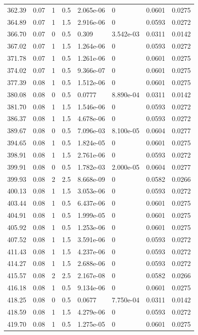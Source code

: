 \documentclass[preview]{standalone}
\begin{document}
{{{\begin{tabular}{L{1.2cm}C{1.2cm} C{0.3cm}C{0.5cm} C{1.4cm}C{1.4cm} C{1.4cm}C{1.4cm}}
  362.39  &  0.07  & 1     & 0.5 &  2.065e-06  & 0  & 0.0601 &  0.0275   \\ 
  364.89  &  0.07  & 1     & 1.5 &  2.916e-06  & 0  & 0.0593 &  0.0272   \\ 
  366.70  &  0.07  & 0     & 0.5 &  0.309  & 3.542e-03  & 0.0311 &  0.0142   \\ 
  367.02  &  0.07  & 1     & 1.5 &  1.264e-06  & 0  & 0.0593 &  0.0272   \\ 
  371.78  &  0.07  & 1     & 0.5 &  1.261e-06  & 0  & 0.0601 &  0.0275   \\ 
  374.02  &  0.07  & 1     & 0.5 &  9.366e-07  & 0  & 0.0601 &  0.0275   \\ 
  377.39  &  0.08  & 1     & 0.5 &  1.512e-06  & 0  & 0.0601 &  0.0275   \\ 
  380.08  &  0.08  & 0     & 0.5 &  0.0777  & 8.890e-04  & 0.0311 &  0.0142   \\ 
  381.70  &  0.08  & 1     & 1.5 &  1.546e-06  & 0  & 0.0593 &  0.0272   \\ 
  386.37  &  0.08  & 1     & 1.5 &  4.678e-06  & 0  & 0.0593 &  0.0272   \\ 
  389.67  &  0.08  & 0     & 0.5 &  7.096e-03  & 8.100e-05  & 0.0604 &  0.0277   \\ 
  394.65  &  0.08  & 1     & 0.5 &  1.824e-05  & 0  & 0.0601 &  0.0275   \\ 
  398.91  &  0.08  & 1     & 1.5 &  2.761e-06  & 0  & 0.0593 &  0.0272   \\ 
  399.91  &  0.08  & 0     & 0.5 &  1.782e-03  & 2.000e-05  & 0.0604 &  0.0277   \\ 
  399.93  &  0.08  & 2     & 2.5 &  8.668e-09  & 0  & 0.0582 &  0.0266   \\ 
  400.13  &  0.08  & 1     & 1.5 &  3.053e-06  & 0  & 0.0593 &  0.0272   \\ 
  403.44  &  0.08  & 1     & 0.5 &  6.437e-06  & 0  & 0.0601 &  0.0275   \\ 
  404.91  &  0.08  & 1     & 0.5 &  1.999e-05  & 0  & 0.0601 &  0.0275   \\ 
  405.92  &  0.08  & 1     & 0.5 &  1.253e-06  & 0  & 0.0601 &  0.0275   \\ 
  407.52  &  0.08  & 1     & 1.5 &  3.591e-06  & 0  & 0.0593 &  0.0272   \\ 
  411.43  &  0.08  & 1     & 1.5 &  4.237e-06  & 0  & 0.0593 &  0.0272   \\ 
  414.27  &  0.08  & 1     & 1.5 &  2.688e-06  & 0  & 0.0593 &  0.0272   \\ 
  415.57  &  0.08  & 2     & 2.5 &  2.167e-08  & 0  & 0.0582 &  0.0266   \\ 
  416.18  &  0.08  & 1     & 0.5 &  9.134e-06  & 0  & 0.0601 &  0.0275   \\ 
  418.25  &  0.08  & 0     & 0.5 &  0.0677  & 7.750e-04  & 0.0311 &  0.0142   \\ 
  418.59  &  0.08  & 1     & 1.5 &  4.279e-06  & 0  & 0.0593 &  0.0272   \\ 
  419.70  &  0.08  & 1     & 0.5 &  1.275e-05  & 0  & 0.0601 &  0.0275   \\ 
\hline 
\end{tabular} 

}}}
\end{document}

